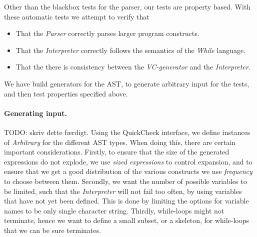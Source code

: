Other than the blackbox tests for the parser, our tests are property based.
With these automatic tests we attempt to verify that
\begin{itemize}
	\item That the \textit{Parser} correctly parses larger program constructs.
	\item That the \textit{Interpreter} correctly follows the semantics of the \textit{While} language.
	\item That the there is consistency between the \textit{VC-generator} and the \textit{Interpreter}.
\end{itemize}
We have build generators for the AST, to generate arbitrary input for the tests, and then test properties specified above.

\paragraph{Generating input.}
TODO: skriv dette færdigt.
Using the QuickCheck interface, we define instances of \textit{Arbitrary} for the different AST types.
When doing this, there are certain important considerations.
Firstly, to ensure that the size of the generated expressions do not explode, we use \textit{sized expressions} to control expansion, and to ensure that we get a good distribution of the various constructs we use \textit{frequency} to choose between them.
Secondly, we want the number of possible variables to be limited, such that the \textit{Interpreter} will not fail too often, by using variables that have not yet been defined. This is done by limiting the options for variable names to be only single character string.
Thirdly, while-loops might not terminate, hence we want to define a small subset, or a skeleton, for while-loops that we can be sure terminates. 

